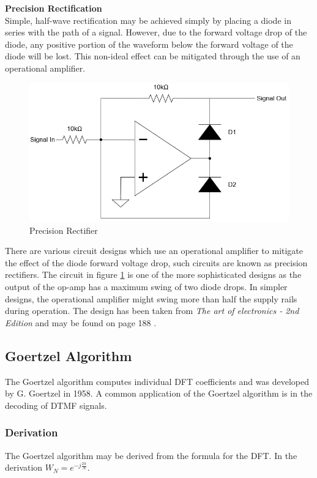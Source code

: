 \textbf{Precision Rectification}\\
Simple, half-wave rectification may be achieved simply by placing a diode in series with the path of a signal. However, due to the forward voltage drop of the diode, any positive portion of the waveform below the forward voltage of the diode will be lost. This non-ideal effect can be mitigated through the use of an operational amplifier.

\begin{figure}[H]
	\centering
	\includegraphics[width=0.6\linewidth]{figures/litreview/precision_rectifier.png}
	\caption{Precision Rectifier}
	\label{fig:precision_rectifier}
\end{figure}

There are various circuit designs which use an operational amplifier to mitigate the effect of the diode forward voltage drop, such circuits are known as precision rectifiers. The circuit in figure \ref{fig:precision_rectifier} is one of the more sophisticated designs as the output of the op-amp has a maximum swing of two diode drops. In simpler designs, the operational amplifier might swing more than half the supply rails during operation. The design has been taken from \textit{The art of electronics - 2nd Edition} and may be found on page 188 \cite{Horowitz1995}.



\subsection{Goertzel Algorithm}
\label{sec:goertzel_lit_review}

The Goertzel algorithm computes individual DFT coefficients and was developed by G. Goertzel in 1958. \cite{Goertzel1958} A common application of the Goertzel algorithm is in the decoding of DTMF\footnotemark{} signals.

\subsubsection{Derivation}
The Goertzel algorithm may be derived from the formula for the DFT. In the derivation \(W_N = e^{-j\frac{2\pi}{N}}\).

